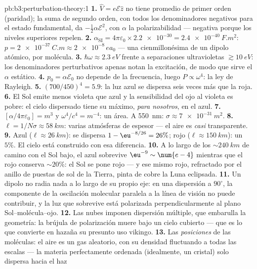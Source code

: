 \begin{solution}{pb:b3:perturbation-theory:1}
\textbf{1.} $\hat V = e\mathcal E\hat z$ no tiene promedio de primer orden
(paridad); la suma de segundo orden, con todos los denominadores negativos
para el estado fundamental, da $-\tfrac12\alpha\mathcal E^2$, con $\alpha$
la polarizabilidad --- negativa porque los niveles superiores repelen.
\textbf{2.} $\alpha_{\text{SI}} = 4\pi\varepsilon_0 \times
\num{2.2e-30} = \qty{2.4e-40}{F.m^2}$: $p = \qty{2e-37}{C.m}
\approx \num{2e-8}\,ea_0$ --- una cienmillonésima de un dipolo
atómico, por molécula.
\textbf{3.} $\hbar\omega \approx \qty{2.3}{eV}$ frente a separaciones
ultravioletas $\gtrsim\qty{10}{eV}$: los denominadores perturbativos apenas
notan la excitación, de modo que sirve el $\alpha$ estático.
\textbf{4.} $p_0 = \alpha\mathcal E_0$ no depende de la frecuencia, luego $P
\propto \omega^4$: la ley de Rayleigh.
\textbf{5.} $(700/450)^4 = 5.9$: la luz azul se dispersa seis veces
más que la roja.
\textbf{6.} El Sol emite menos violeta que azul y la sensibilidad del ojo al
violeta es pobre: el cielo dispersado tiene su máximo, \emph{para
nosotros}, en el azul.
\textbf{7.} $[\alpha/4\pi\varepsilon_0] = \unit{m^3}$ y
$\omega^4/c^4 = \unit{m^{-4}}$: un área. A \qty{550}{nm}:
$\sigma \approx \qty{7e-31}{m^2}$.
\textbf{8.} $\ell = 1/N\sigma \approx \qty{58}{km}$: varias
atmósferas de espesor --- el aire es \emph{casi} transparente.
\textbf{9.} Azul ($\ell \approx \qty{26}{km}$): se dispersa $1 -
\eu^{-8/26} = 26\%$; rojo ($\ell \approx \qty{150}{km}$):
un $5\%$. El cielo está construido con esa diferencia.
\textbf{10.} A lo largo de los $\sim\qty{240}{km}$ de camino con el Sol
bajo, el azul sobrevive $\eu^{-9} \sim \num{e-4}$ mientras que el rojo
conserva $\sim20\%$: el Sol se pone rojo --- y ese mismo rojo, refractado
por el anillo de puestas de sol de la Tierra, pinta de cobre la Luna
eclipsada.
\textbf{11.} Un dipolo no radia nada a lo largo de su propio eje: en una
dispersión a $90^\circ$, la componente de la oscilación molecular
paralela a la línea de visión no puede contribuir, y la luz que
sobrevive está polarizada perpendicularmente al plano Sol--molécula--ojo.
\textbf{12.} Las nubes imponen dispersión múltiple, que embarulla
la geometría: la brújula de polarización muere bajo un cielo cubierto ---
que es lo que convierte en hazaña su presunto uso vikingo.
\textbf{13.} Las \emph{posiciones} de las moléculas: el aire es un gas
aleatorio, con su densidad fluctuando a todas las escalas --- la materia
perfectamente ordenada (idealmente, un cristal) solo dispersa hacia el haz

\end{solution}
